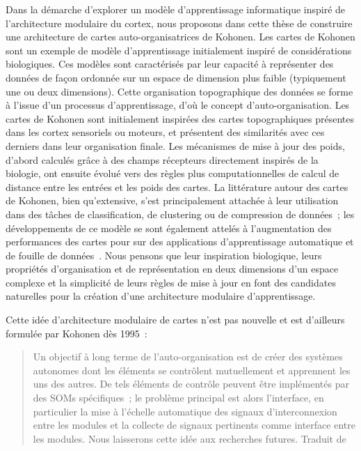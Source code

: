 Dans la démarche d'explorer un modèle d'apprentissage informatique inspiré de l'architecture modulaire du cortex, nous proposons dans cette thèse de construire une architecture de cartes auto-organisatrices de Kohonen.
Les cartes de Kohonen \parencite{Kohonen1982} sont un exemple de modèle d'apprentissage initialement inspiré de considérations biologiques.
Ces modèles sont caractérisés par leur capacité à représenter des données de façon ordonnée sur un espace de dimension plus faible (typiquement une ou deux dimensions). Cette organisation topographique des données se forme à l'issue d'un processus d'apprentissage, d'où le concept d'auto-organisation.
Les cartes de Kohonen sont initialement inspirées des cartes topographiques présentes dans les cortex sensoriels ou moteurs, et présentent des similarités avec ces derniers dans leur organisation finale.
Les mécanismes de mise à jour des poids, d'abord calculés grâce à des champs récepteurs directement inspirés de la biologie, ont ensuite évolué vers des règles plus computationnelles de calcul de distance entre les entrées et les poids des cartes.
La littérature autour des cartes de Kohonen, bien qu'extensive, s'est principalement attachée à leur utilisation dans des tâches de classification, de clustering ou de compression de données~; les développements de ce modèle se sont également attelés à l'augmentation des performances des cartes pour sur des applications d'apprentissage automatique et de fouille de données~\parencite{kohonen_essentials_2013}.
Nous pensons que leur inspiration biologique, leurs propriétés d'organisation et de représentation en deux dimensions d'un espace complexe et la simplicité de leurs règles de mise à jour en font des candidates naturelles pour la création d'une architecture modulaire d'apprentissage.

Cette idée d'architecture modulaire de cartes n'est pas nouvelle et est d'ailleurs formulée par Kohonen dès 1995~:
\begin{quote}
Un objectif à long terme de l'auto-organisation est de créer des systèmes autonomes dont les éléments se contrôlent mutuellement et apprennent les uns des autres. De tels éléments de contrôle peuvent être implémentés par des SOMs spécifiques~; le problème principal est alors l'interface, en particulier la mise à l'échelle automatique des signaux d'interconnexion entre les modules et la collecte de signaux pertinents comme interface entre les modules. Nous laisserons cette idée aux recherches futures.
Traduit de \cite{Kohonen1995SelfOrganizingM}
\end{quote}

